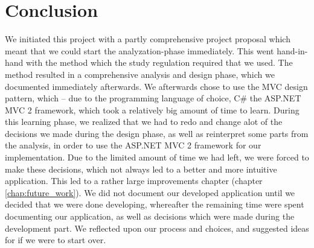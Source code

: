 \chapter{Conclusion}
\label{chap:conclusion}
We initiated this project with a partly comprehensive project proposal which meant that we could start the analyzation-phase immediately. This went hand-in-hand with the \ooad{} method which the study regulation required that we used. The \ooad{} method resulted in a comprehensive analysis and design phase, which we documented immediately afterwards. We afterwards chose to use the MVC design pattern, which -- due to the programming language of choice, C\# the ASP.NET MVC 2 framework, which took a relatively big amount of time to learn. During this learning phase, we realized that we had to redo and change alot of the decisions we made during the design phase, as well as reinterpret some parts from the analysis, in order to use the ASP.NET MVC 2 framework for our implementation. Due to the limited amount of time we had left, we were forced to make these decisions, which not always led to a better and more intuitive application. This led to a rather large improvements chapter (chapter \ref{chap:future_work}). We did not document our developed application until we decided that we were done developing, whereafter the remaining time were spent documenting our application, as well as decisions which were made during the development part. We reflected upon our process and choices, and suggested ideas for if we were to start over.








